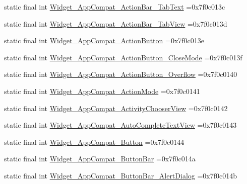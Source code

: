 \begin{DoxyCompactItemize}
\item 
static final int \mbox{\hyperlink{classbr_1_1unb_1_1cic_1_1mp_1_1marketmaster_1_1test_1_1R_1_1style_a2c2bf3e7fc05ed9149d942dcd5d79d6c}{Widget\+\_\+\+App\+Compat\+\_\+\+Action\+Bar\+\_\+\+Tab\+Text}} =0x7f0c013c
\item 
static final int \mbox{\hyperlink{classbr_1_1unb_1_1cic_1_1mp_1_1marketmaster_1_1test_1_1R_1_1style_a4b88465088f70f29842f38a0ab3f6619}{Widget\+\_\+\+App\+Compat\+\_\+\+Action\+Bar\+\_\+\+Tab\+View}} =0x7f0c013d
\item 
static final int \mbox{\hyperlink{classbr_1_1unb_1_1cic_1_1mp_1_1marketmaster_1_1test_1_1R_1_1style_aba015236f4c90a6ae7e96ee1a43ba39d}{Widget\+\_\+\+App\+Compat\+\_\+\+Action\+Button}} =0x7f0c013e
\item 
static final int \mbox{\hyperlink{classbr_1_1unb_1_1cic_1_1mp_1_1marketmaster_1_1test_1_1R_1_1style_ab0c85d91a88768e34669baa83dbb6c8e}{Widget\+\_\+\+App\+Compat\+\_\+\+Action\+Button\+\_\+\+Close\+Mode}} =0x7f0c013f
\item 
static final int \mbox{\hyperlink{classbr_1_1unb_1_1cic_1_1mp_1_1marketmaster_1_1test_1_1R_1_1style_af2a9907c0d7adaa1f954da3f72e8a50b}{Widget\+\_\+\+App\+Compat\+\_\+\+Action\+Button\+\_\+\+Overflow}} =0x7f0c0140
\item 
static final int \mbox{\hyperlink{classbr_1_1unb_1_1cic_1_1mp_1_1marketmaster_1_1test_1_1R_1_1style_a9661a25037077a0303234405dcef6b0b}{Widget\+\_\+\+App\+Compat\+\_\+\+Action\+Mode}} =0x7f0c0141
\item 
static final int \mbox{\hyperlink{classbr_1_1unb_1_1cic_1_1mp_1_1marketmaster_1_1test_1_1R_1_1style_a19392855ab8e9ca973d3e86b5c24ec1e}{Widget\+\_\+\+App\+Compat\+\_\+\+Activity\+Chooser\+View}} =0x7f0c0142
\item 
static final int \mbox{\hyperlink{classbr_1_1unb_1_1cic_1_1mp_1_1marketmaster_1_1test_1_1R_1_1style_a2fafdeb8688b534463c4cd3c8b7a3520}{Widget\+\_\+\+App\+Compat\+\_\+\+Auto\+Complete\+Text\+View}} =0x7f0c0143
\item 
static final int \mbox{\hyperlink{classbr_1_1unb_1_1cic_1_1mp_1_1marketmaster_1_1test_1_1R_1_1style_a090faaf3bbe70804e29bae4bb92042e8}{Widget\+\_\+\+App\+Compat\+\_\+\+Button}} =0x7f0c0144
\item 
static final int \mbox{\hyperlink{classbr_1_1unb_1_1cic_1_1mp_1_1marketmaster_1_1test_1_1R_1_1style_a7d7e7ffb886b77ddb33ca8528dd7b36d}{Widget\+\_\+\+App\+Compat\+\_\+\+Button\+Bar}} =0x7f0c014a
\item 
static final int \mbox{\hyperlink{classbr_1_1unb_1_1cic_1_1mp_1_1marketmaster_1_1test_1_1R_1_1style_aa4596e5b70277cf46fd59a68fc5e2b71}{Widget\+\_\+\+App\+Compat\+\_\+\+Button\+Bar\+\_\+\+Alert\+Dialog}} =0x7f0c014b

\end{DoxyCompactItemize}
